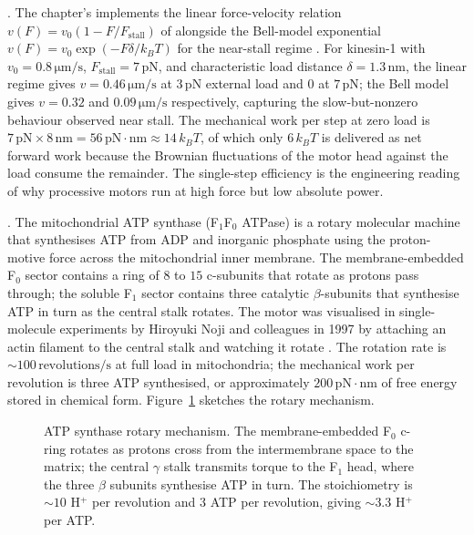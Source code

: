 . The
chapter's  implements the
linear force-velocity relation $v(F) = v_0 (1 - F/F_{\text{stall}})$
of \cite{paper:v6c04-howard-1996} alongside the Bell-model
exponential $v(F) = v_0 \exp(-F \delta / k_B T)$ for the near-stall
regime \cite{paper:v6c04-bell-1978}. For kinesin-1 with
$v_0 = 0.8\,\si{\micro\meter}/\text{s}$,
$F_{\text{stall}} = 7\,\text{pN}$, and characteristic load distance
$\delta = 1.3\,\text{nm}$, the linear regime gives
$v = 0.46\,\si{\micro\meter}/\text{s}$ at $3\,\text{pN}$ external
load and $0$ at $7\,\text{pN}$; the Bell model gives $v = 0.32$ and
$0.09\,\si{\micro\meter}/\text{s}$ respectively, capturing the
slow-but-nonzero behaviour observed near stall. The mechanical work
per step at zero load is $7\,\text{pN} \times 8\,\text{nm} =
56\,\text{pN}\cdot\text{nm} \approx 14\,k_B T$, of which only
$6\,k_B T$ is delivered as net forward work because the Brownian
fluctuations of the motor head against the load consume the
remainder. The single-step efficiency is the engineering reading of
why processive motors run at high force but low absolute power.

. The mitochondrial ATP synthase
(F$_1$F$_0$ ATPase) is a rotary molecular machine that synthesises
ATP from ADP and inorganic phosphate using the proton-motive force
across the mitochondrial inner membrane. The membrane-embedded F$_0$
sector contains a ring of $8$ to $15$ c-subunits that rotate as
protons pass through; the soluble F$_1$ sector contains three
catalytic $\beta$-subunits that synthesise ATP in turn as the
central stalk rotates. The motor was visualised in single-molecule
experiments by Hiroyuki Noji and colleagues in 1997 by attaching an
actin filament to the central stalk and watching it rotate
\cite{paper:v6c04-noji-1997}. The rotation rate is
$\sim 100\,\text{revolutions}/\text{s}$ at full load in mitochondria;
the mechanical work per revolution is three ATP synthesised, or
approximately $200\,\text{pN}\cdot\text{nm}$ of free energy stored
in chemical form. Figure~\ref{fig:v6c04-atpsynthase} sketches the
rotary mechanism.

\begin{figure}[ht]
\centering

\caption{ATP synthase rotary mechanism. The membrane-embedded F$_0$
c-ring rotates as protons cross from the intermembrane space to the
matrix; the central $\gamma$ stalk transmits torque to the F$_1$
head, where the three $\beta$ subunits synthesise ATP in turn. The
stoichiometry is $\sim 10$ H$^+$ per revolution and $3$ ATP per
revolution, giving $\sim 3.3$ H$^+$ per ATP.}
\label{fig:v6c04-atpsynthase}
\end{figure}

